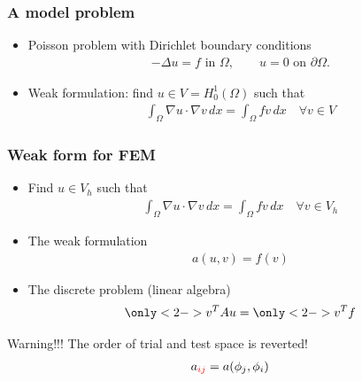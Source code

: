 \begin{frame}
  \frametitle{A model problem}
  \begin{itemize}
  \item Poisson problem with Dirichlet boundary conditions
    \begin{gather*}
      -\Delta u = f \text{ in }\Omega,\qquad u=0 \text{ on }\partial\Omega.
    \end{gather*}
  \item Weak formulation: find $u\in V = H^1_0(\Omega)$ such that
    \begin{gather*}
      \int_\Omega \nabla u\cdot \nabla v \,dx
      =
      \int_\Omega fv\,dx
      \quad\forall v\in V
    \end{gather*}
  \end{itemize}
\end{frame}

\begin{frame}
  \frametitle{Weak form for FEM}
  \begin{itemize}
  \item Find $u\in V_h$ such that
    \begin{gather*}
      \int_\Omega \nabla u\cdot \nabla v \,dx
      =
      \int_\Omega fv\,dx
      \quad\forall v\in V_h
    \end{gather*}
  \item The weak formulation
    \begin{gather*}
      a(u,v) = f(v)
    \end{gather*}
  \item The discrete problem (linear algebra)
    \begin{gather*}
      \only<2->{v^T} Au =  \only<2->{v^T}f
    \end{gather*}
  \end{itemize}
  \pause
  \begin{block}{Warning!!!}
    The order of trial and test space is reverted!
    \begin{gather*}
      a_{\red ij} = %
      a(\phi_j, \phi_i)
    \end{gather*}
  \end{block}
\end{frame}

